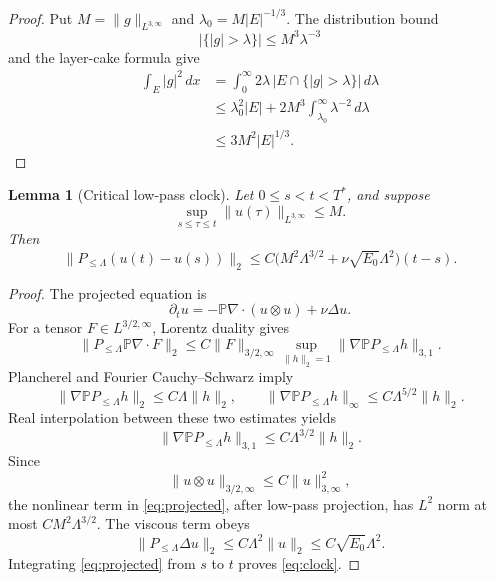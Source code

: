 \documentclass[11pt]{article}
\newtheorem{lemma}[theorem]{Lemma}
\theoremstyle{remark}
\newcommand{\PP}{\mathbb P}
\begin{document}
\begin{proof}
Put \(M=\|g\|_{L^{3,\infty}}\) and
\(\lambda_0=M|E|^{-1/3}\).  The distribution bound
\[
 |\{|g|>\lambda\}|\leq M^3\lambda^{-3}
\]
and the layer-cake formula give
\begin{align*}
 \int_E|g|^2\,dx
 &=
 \int_0^\infty
 2\lambda\,|E\cap\{|g|>\lambda\}|\,d\lambda\\
 &\leq
 \lambda_0^2|E|
 +2M^3\int_{\lambda_0}^{\infty}\lambda^{-2}\,d\lambda\\
 &\leq3M^2|E|^{1/3}.
\end{align*}
\end{proof}

\begin{lemma}[Critical low-pass clock]
\label{lem:clock}
Let \(0\leq s<t<T^*\), and suppose
\[
 \sup_{s\leq\tau\leq t}
 \|u(\tau)\|_{L^{3,\infty}}\leq M.
\]
Then
\begin{equation}
 \label{eq:clock}
 \boxed{
 \|P_{\leq\Lambda}(u(t)-u(s))\|_2
 \leq
 C\bigl(
 M^2\Lambda^{3/2}
 +\nu\sqrt{E_0}\Lambda^2
 \bigr)(t-s).
 }
\end{equation}
\end{lemma}

\begin{proof}
The projected equation is
\begin{equation}
 \label{eq:projected}
 \partial_tu
 =-\PP\nabla\cdot(u\otimes u)+\nu\Delta u.
\end{equation}
For a tensor \(F\in L^{3/2,\infty}\), Lorentz duality gives
\begin{equation}
 \label{eq:dual}
 \|P_{\leq\Lambda}\PP\nabla\cdot F\|_2
 \leq
 C\|F\|_{3/2,\infty}
 \sup_{\|h\|_2=1}
 \|\nabla\PP P_{\leq\Lambda}h\|_{3,1}.
\end{equation}
Plancherel and Fourier Cauchy--Schwarz imply
\[
 \|\nabla\PP P_{\leq\Lambda}h\|_2
 \leq C\Lambda\|h\|_2,
\qquad
 \|\nabla\PP P_{\leq\Lambda}h\|_\infty
 \leq C\Lambda^{5/2}\|h\|_2.
\]
Real interpolation between these two estimates yields
\begin{equation}
 \label{eq:lorentz-bernstein}
 \|\nabla\PP P_{\leq\Lambda}h\|_{3,1}
 \leq C\Lambda^{3/2}\|h\|_2.
\end{equation}
Since
\[
 \|u\otimes u\|_{3/2,\infty}
 \leq C\|u\|_{3,\infty}^2,
\]
the nonlinear term in \eqref{eq:projected}, after low-pass projection,
has \(L^2\) norm at most \(CM^2\Lambda^{3/2}\).  The viscous term obeys
\[
 \|P_{\leq\Lambda}\Delta u\|_2
 \leq C\Lambda^2\|u\|_2
 \leq C\sqrt{E_0}\Lambda^2.
\]
Integrating \eqref{eq:projected} from \(s\) to \(t\) proves
\eqref{eq:clock}.
\end{proof}
\end{document}
